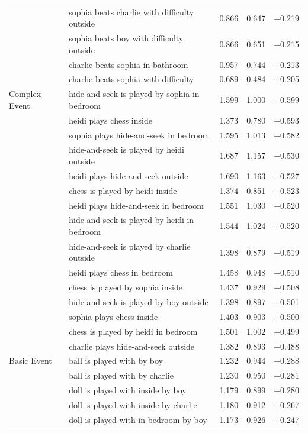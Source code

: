 \begin{longtable}{@{}llrrr@{}}
 & sophia beats charlie with difficulty outside & 0.866 & 0.647 & +0.219 \\
 & sophia beats boy with difficulty outside & 0.866 & 0.651 & +0.215 \\
 & charlie beats sophia in bathroom & 0.957 & 0.744 & +0.213 \\
 & charlie beats sophia with difficulty & 0.689 & 0.484 & +0.205 \\
\addlinespace
Complex Event & hide-and-seek is played by sophia in bedroom & 1.599 & 1.000 & +0.599 \\
 & heidi plays chess inside & 1.373 & 0.780 & +0.593 \\
 & sophia plays hide-and-seek in bedroom & 1.595 & 1.013 & +0.582 \\
 & hide-and-seek is played by heidi outside & 1.687 & 1.157 & +0.530 \\
 & heidi plays hide-and-seek outside & 1.690 & 1.163 & +0.527 \\
 & chess is played by heidi inside & 1.374 & 0.851 & +0.523 \\
 & heidi plays hide-and-seek in bedroom & 1.551 & 1.030 & +0.520 \\
 & hide-and-seek is played by heidi in bedroom & 1.544 & 1.024 & +0.520 \\
 & hide-and-seek is played by charlie outside & 1.398 & 0.879 & +0.519 \\
 & heidi plays chess in bedroom & 1.458 & 0.948 & +0.510 \\
 & chess is played by sophia inside & 1.437 & 0.929 & +0.508 \\
 & hide-and-seek is played by boy outside & 1.398 & 0.897 & +0.501 \\
 & sophia plays chess inside & 1.403 & 0.903 & +0.500 \\
 & chess is played by heidi in bedroom & 1.501 & 1.002 & +0.499 \\
 & charlie plays hide-and-seek outside & 1.382 & 0.893 & +0.488 \\
\addlinespace
Basic Event & ball is played with by boy & 1.232 & 0.944 & +0.288 \\
 & ball is played with by charlie & 1.230 & 0.950 & +0.281 \\
 & doll is played with inside by boy & 1.179 & 0.899 & +0.280 \\
 & doll is played with inside by charlie & 1.180 & 0.912 & +0.267 \\
 & doll is played with in bedroom by boy & 1.173 & 0.926 & +0.247 \\

\end{longtable}
